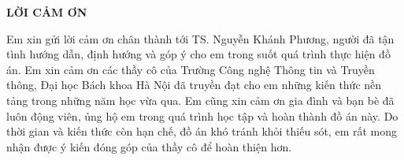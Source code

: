 \documentclass[../DoAn.tex]{subfiles}
\begin{document}
\begin{center}
    \Large{\textbf{LỜI CẢM ƠN}}\\
\end{center}
\vspace{1cm}
Em xin gửi lời cảm ơn chân thành tới TS. Nguyễn Khánh Phương, người đã tận tình hướng dẫn, định hướng và góp ý cho em trong suốt quá trình thực hiện đồ án. Em xin cảm ơn các thầy cô của Trường Công nghệ Thông tin và Truyền thông, Đại học Bách khoa Hà Nội đã truyền đạt cho em những kiến thức nền tảng trong những năm học vừa qua. Em cũng xin cảm ơn gia đình và bạn bè đã luôn động viên, ủng hộ em trong quá trình học tập và hoàn thành đồ án này. Do thời gian và kiến thức còn hạn chế, đồ án khó tránh khỏi thiếu sót, em rất mong nhận được ý kiến đóng góp của thầy cô để hoàn thiện hơn.
\end{document}
